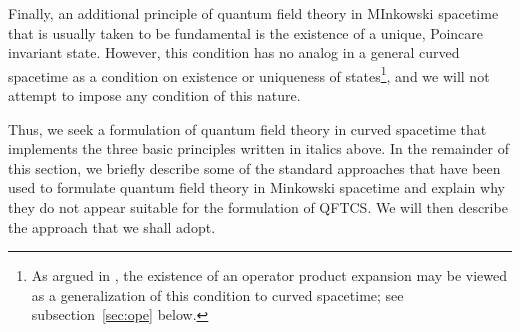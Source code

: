 \documentclass[12pt]{article}
\theoremstyle{plain}
\theoremstyle{definition}
\begin{document}
Finally, an additional principle of quantum field theory in MInkowski spacetime that is usually taken to be fundamental is the existence of a unique, Poincare invariant state. However, this condition has no analog in a general curved spacetime as a condition on existence or uniqueness of states\footnote{As argued in \cite{hw5}, the existence of an operator product expansion may be viewed as a generalization of this condition to curved spacetime; see subsection~\ref{sec:ope} below.}, and we will not attempt to impose any condition of this nature.

Thus, we seek a formulation of quantum field theory in curved spacetime that implements the three basic principles written in italics above. In the remainder of this section, we briefly describe some of the standard approaches that have been used to formulate quantum field theory in Minkowski spacetime and explain why they do not appear suitable for the formulation of QFTCS. We will then describe the approach that we shall adopt.
\end{document}

